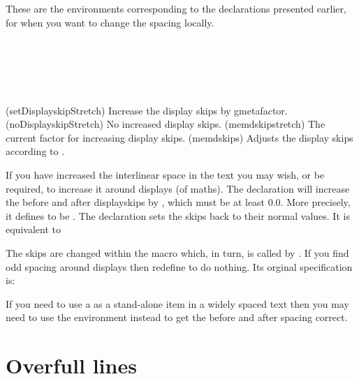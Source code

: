 These are the environments corresponding to the declarations presented
earlier, for when you want to change the spacing locally.

\begin{syntax}
\cmd{\setDisplayskipStretch} \\
\cmd{\memdskipstretch} \\
\cmd{\noDisplayskipStretch} \\
\cmd{\memdskips} \\
\end{syntax}
\glossary(setDisplayskipStretch)%
  {}%
  {Increase the display skips by gmeta{factor}.}%
\glossary(noDisplayskipStretch)%
  {}%
  {No increased display skips.}%
\glossary(memdskipstretch)%
  {}%
  {The current factor for increasing display skips.}%
\glossary(memdskips)%
  {}%
  {Adjusts the display skips according to .}%


If you have increased the interlinear space in the text you may wish, or be
required, to increase it around displays (of maths). 
The declaration \cmd{\setDisplayskipStretch} will increase the before 
and after displayskips by , which must be at least 0.0. 
More precisely, it defines \cmd{\memdskipstretch} to be .
The \cmd{\noDisplayskipStretch} declaration
sets the skips back to their normal values. It is equivalent to
\begin{lcode}
\end{lcode}
The skips are changed within the macro \cmd{\memdskips} which, in turn, is
called by \cmd{\everydisplay}. If you find odd spacing around displays then
redefine \cmd{\memdskips} to do nothing. Its orginal specification is:
\begin{lcode}
\newcommand*{\memdskips}{%
  \advance\abovedisplayskip \memdskipstretch\abovedisplayskip
  \advance\belowdisplayskip \memdskipstretch\belowdisplayskip
  \advance\abovedisplayshortskip \memdskipstretch\abovedisplayshortskip
  \advance\belowdisplayshortskip \memdskipstretch\belowdisplayshortskip}
\end{lcode}

    If you need to use a  as a stand-alone item in a widely 
spaced text then you
may need to use the  environment instead to get the before and
after spacing correct.


\section{Overfull lines}

